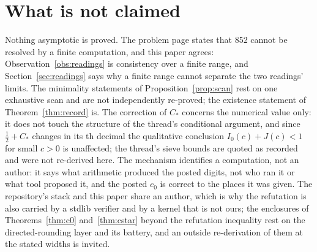 \documentclass[11pt]{article}
\theoremstyle{definition}\newtheorem{observation}{Observation}
\newcommand{\Cstar}{C_{*}}
\begin{document}
\section{What is not claimed}

Nothing asymptotic is proved. The problem page states that 852 cannot be resolved by a finite computation, and this paper agrees: Observation~\ref{obs:readings} is consistency over a finite range, and Section~\ref{sec:readings} says why a finite range cannot separate the two readings' limits. The minimality statements of Proposition~\ref{prop:scan} rest on one exhaustive scan and are not independently re-proved; the existence statement of Theorem~\ref{thm:record} is. The correction of $\Cstar$ concerns the numerical value only: it does not touch the structure of the thread's conditional argument, and since $\tfrac12+\Cstar$ changes in its \CstarDiffDecimal{}th decimal the qualitative conclusion $I_0(c)+J(c)<1$ for small $c>0$ is unaffected; the thread's sieve bounds are quoted as recorded and were not re-derived here. The mechanism identifies a computation, not an author: it says what arithmetic produced the posted digits, not who ran it or what tool proposed it, and the posted $c_0$ is correct to the places it was given. The repository's stack and this paper share an author, which is why the refutation is also carried by a stdlib verifier and by a kernel that is not ours; the enclosures of Theorems~\ref{thm:c0} and~\ref{thm:cstar} beyond the refutation inequality rest on the directed-rounding layer and its battery, and an outside re-derivation of them at the stated widths is invited.
\end{document}
